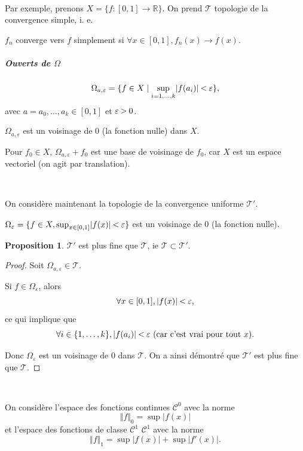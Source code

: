 \documentclass[french]{book}
\theoremstyle{definition}
\newtheorem{protoproposition}{Proposition}[section]
\newenvironment{prop}
    {\colorlet{shadecolor}{blue!5}\begin{shaded}\begin{protoproposition}}
    {\end{protoproposition}\end{shaded}}
\theoremstyle{remark}
\newcommand{\lesss}{\rotatebox[origin=c]{90}{$\land$}}
\newcommand{\less}{\ \lesss\ }
\newcommand{\biggg}{\rotatebox[origin=c]{90}{$\lor$}}
\newcommand{\bg}{\ \biggg\ }
\begin{document}
\

Par exemple, prenons $X = \{ f :[0, 1] \to \mathbb{R} \} $. On prend $\mathscr{T} $ topologie de la convergence simple, i. e.

$f_n $ converge vers $ f$ simplement si $\forall x \in [0, 1], f_n(x) \to f(x)$.

\subparagraph{Ouverts de $\Omega$}

$$\Omega _{a, \varepsilon } = \{ f \in X \mid \sup _{i =1, \dots, k} \lvert f(a_i) \rvert \less \varepsilon \}, $$ avec $a = a_0, \dots, a_k \in [0, 1]$ et $\varepsilon  \bg 0$.

$\Omega _{a, \varepsilon } $ est un voisinage de 0 (la fonction nulle) dans $X$.

Pour $f_0 \in X$, $\Omega _{a, \varepsilon } + f_0$ est une base de voisinage de $f_0$, car $X$ est un espace vectoriel (on agit par translation).

\

On considère maintenant la topologie de la convergence uniforme $\mathscr{T}' $.

$\Omega _{\varepsilon } = \{ f \in X, \sup_{ x \in [0, 1] } \lvert f(x) \rvert \less \varepsilon   \} $ est un voisinage de $0$ (la fonction nulle).

\begin{prop}
  $\mathscr{T}' $ est plus fine que $\mathscr{T} $, ie $\mathscr{T} \subset \mathscr{T}' $.
\end{prop}

\begin{proof}
  Soit $\Omega _{a, \varepsilon } \in \mathscr{T}  $.


  Si $f \in \Omega _{\varepsilon }$, alors $$\forall x \in [0, 1], \lvert f(x) \rvert \less \varepsilon, $$ ce qui implique que $$ \forall i \in \{ 1, \dots, k \}, \lvert f(a_i) \rvert \less \varepsilon \ (\text{car c'est vrai pour tout } x). $$

   Donc $\Omega  _{\varepsilon } $ est un voisinage de 0 dans $\mathscr{T} $. On a ainsi démontré que $\mathscr{T}' $ est plus fine que $\mathscr{T} $.

\end{proof}

\

On considère l'espace des fonctions continues $\mathcal{C}^0$ avec la norme $$ \Vert f \Vert _{0} = \sup_{  } \lvert f(x) \rvert $$ et l'espace des fonctions de classe $\mathcal{C}^1$ $\mathcal{C}^1$ avec la norme $$\Vert f \Vert _{1} = \sup \lvert f(x) \rvert + \sup \lvert f'(x) \rvert.$$
\end{document}
